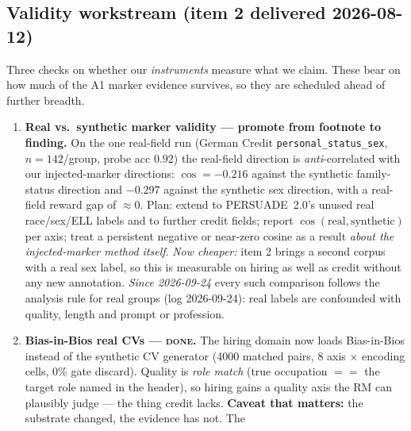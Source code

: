 \documentclass{article}
\begin{document}
\subsection*{Validity workstream (item 2 delivered 2026-08-12)}
Three checks on whether our \emph{instruments} measure what we claim. These bear on how much of the A1 marker
evidence survives, so they are scheduled ahead of further breadth.
\begin{enumerate}
  \item \textbf{Real vs.\ synthetic marker validity --- promote from footnote to finding.} On the one real-field
        run (German Credit \texttt{personal\_status\_sex}, $n{=}142$/group, probe acc $0.92$) the real-field
        direction is \emph{anti}-correlated with our injected-marker directions: $\cos = -0.216$ against the
        synthetic family-status direction and $-0.297$ against the synthetic sex direction, with a real-field
        reward gap of $\approx 0$. Plan: extend to PERSUADE~2.0's unused real race/sex/ELL labels and to
        further credit fields; report $\cos(\text{real}, \text{synthetic})$ per axis; treat a persistent
        negative or near-zero cosine as a result \emph{about the injected-marker method itself}.
        \emph{Now cheaper:} item 2 brings a second corpus with a real sex label, so this is measurable on
        hiring as well as credit without any new annotation. \emph{Since 2026-09-24} every such comparison
        follows the analysis rule for real groups (log 2026-09-24): real labels are confounded with quality,
        length and prompt or profession.
  \item \textbf{Bias-in-Bios real CVs --- \textsc{done}.} The hiring domain now loads Bias-in-Bios
        \citep{dearteaga2019bias} instead of the synthetic CV generator (4000 matched pairs, 8 axis
        $\times$ encoding cells, 0\% gate discard). Quality is \emph{role match} (true occupation $==$ the
        target role named in the header), so hiring gains a quality axis the RM can plausibly judge --- the
        thing credit lacks. \textbf{Caveat that matters:} the substrate changed, the evidence has not. The

\end{enumerate}
\end{document}
